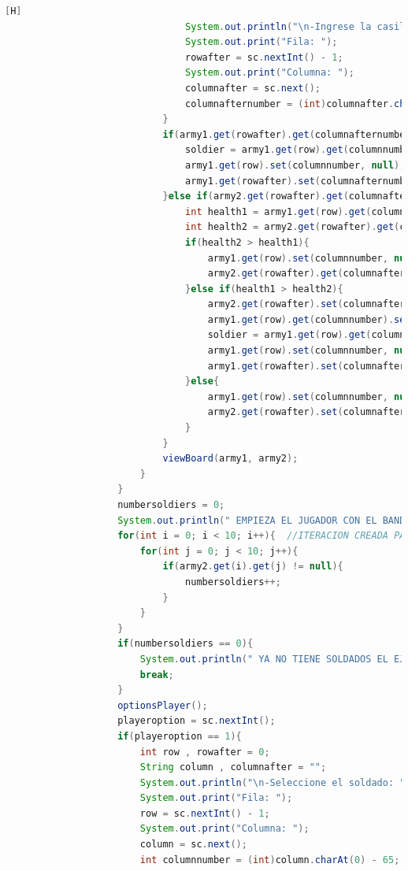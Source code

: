 \documentclass{article}
\begin{document}
\begin{lstlisting}[language=java,caption={Las lineas de codigos del metodo creado:}][H]
								System.out.println("\n-Ingrese la casilla a mover");    
								System.out.print("Fila: ");
								rowafter = sc.nextInt() - 1;
								System.out.print("Columna: ");
								columnafter = sc.next();
								columnafternumber = (int)columnafter.charAt(0) - 65; 
							}
							if(army1.get(rowafter).get(columnafternumber) == null && army2.get(rowafter).get(columnafternumber) == null){
								soldier = army1.get(row).get(columnnumber);
								army1.get(row).set(columnnumber, null);
								army1.get(rowafter).set(columnafternumber,soldier);
							}else if(army2.get(rowafter).get(columnafternumber) != null){
								int health1 = army1.get(row).get(columnnumber).getLifeActual();
								int health2 = army2.get(rowafter).get(columnafternumber).getLifeActual();
								if(health2 > health1){
									army1.get(row).set(columnnumber, null);
									army2.get(rowafter).get(columnafternumber).setLifeActual(health2 - health1);
								}else if(health1 > health2){
									army2.get(rowafter).set(columnafternumber, null); //ELIMINAMOS AL SOLDADO DEL OTRO BANDO DE ESA CASILLA
									army1.get(row).get(columnnumber).setLifeActual(health1 - health2); //CAMBIAMOS LA VIDA ANTES DE MANDARLO CON EL OBJETO SOLDADO QUE HICIMOS
									soldier = army1.get(row).get(columnnumber);
									army1.get(row).set(columnnumber, null); //ELIMINAMOS AL SOLDADO DE LA CASILLA DE DONDE ESTABA
									army1.get(rowafter).set(columnafternumber, soldier); //PONEMOS AL SOLDADO EN LA NUEVA CASILLA
								}else{
									army1.get(row).set(columnnumber, null);
									army2.get(rowafter).set(columnafternumber, null);
								}
							}
							viewBoard(army1, army2);
						}
					}
					numbersoldiers = 0;
					System.out.println(" EMPIEZA EL JUGADOR CON EL BANDO --Y-- ");
					for(int i = 0; i < 10; i++){  //ITERACION CREADA PARA PODER SABER QUE SI ESTE BANDO DEL EJERCITO TIENE SOLDADOS PARA PODER JUGAR EL CUAL VAMOS A TENER QUE CONTAR
						for(int j = 0; j < 10; j++){
							if(army2.get(i).get(j) != null){
								numbersoldiers++;
							}
						}
					}
					if(numbersoldiers == 0){
						System.out.println(" YA NO TIENE SOLDADOS EL EJERCITO --Y-- USTED A PERDIDO POR LO TANTO GANO EL EJERCITO --X-- ");
						break;
					}
					optionsPlayer();
					playeroption = sc.nextInt();
					if(playeroption == 1){
						int row , rowafter = 0;
						String column , columnafter = "";
						System.out.println("\n-Seleccione el soldado: ");
						System.out.print("Fila: ");
						row = sc.nextInt() - 1;
						System.out.print("Columna: ");
						column = sc.next();
						int columnnumber = (int)column.charAt(0) - 65;  

\end{lstlisting}
\end{document}
